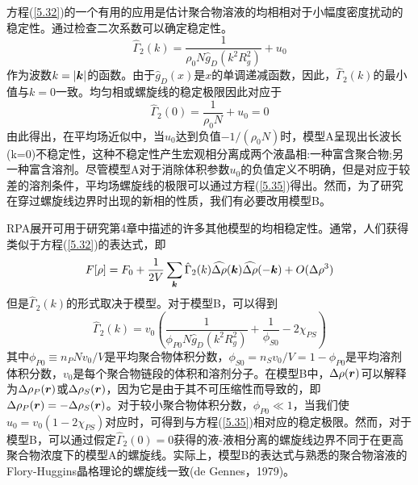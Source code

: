 方程(\ref{5.32})的一个有用的应用是估计聚合物溶液的均相相对于小幅度密度扰动的稳定性。通过检查二次系数可以确定稳定性。
\begin{equation}\label{5.34}
\hat{\Gamma}_2(k)=\frac{1}{\rho_0N\hat{g}_D(k^2R_g^2)}+u_0
\end{equation}
作为波数$k=\left|\bm{k}\right|$的函数。由于$\hat{g}_D(x)$是$x$的单调递减函数，因此，$\hat{\Gamma}_2(k)$的最小值与$k=0$一致。均匀相或螺旋线的稳定极限因此对应于
\begin{equation}\label{5.35}
\hat{\Gamma}_2(0)=\frac{1}{\rho_0N}+u_0=0
\end{equation}
由此得出，在平均场近似中，当$u_0$达到负值$-1/(\rho_0N)$时，模型A呈现出长波长(k=0)不稳定性，这种不稳定性产生宏观相分离成两个液晶相:一种富含聚合物;另一种富含溶剂。尽管模型A对于消除体积参数$u_0$的负值定义不明确，但是对应于较差的溶剂条件，平均场螺旋线的极限可以通过方程(\ref{5.35})得出。然而，为了研究在穿过螺旋线边界时出现的新相的性质，我们有必要改用模型B。

RPA展开可用于研究第4章中描述的许多其他模型的均相稳定性。通常，人们获得类似于方程(\ref{5.32})的表达式，即
\begin{equation}\label{5.36}
F[\rho]=F_0+\frac{1}{2V}\sum\limits_{\bm{k}}\hat{\Gamma}_2(k)\widehat{\Delta\rho}(\bm{k})\widehat{\Delta\rho}(-\bm{k})+O(\Delta\rho^3)
\end{equation}
但是$\hat{\Gamma}_2(k)$的形式取决于模型。对于模型B，可以得到
\begin{equation}\label{5.37}
\hat{\Gamma}_2(k)=v_0\left(\frac{1}{\phi_{P0}N\hat{g}_D(k^2R_g^2)}+\frac{1}{\phi_{S0}}-2\chi_{PS}\right)
\end{equation}
其中$\phi_{P0}\equiv n_PNv_0/V$是平均聚合物体积分数，$\phi_{S0}=n_Sv_0/V=1-\phi_{P0}$是平均溶剂体积分数，$v_0$是每个聚合物链段的体积和溶剂分子。在模型B中，$\Delta\rho(\bm{r})$可以解释为$\Delta\rho_P(\bm{r})$或$\Delta\rho_S(\bm{r})$，因为它是由于其不可压缩性而导致的，即$\Delta\rho_P(\bm{r})=-\Delta\rho_S(\bm{r})$。对于较小聚合物体积分数，$\phi_{P0}\ll 1$，当我们使$u_0=v_0(1-2\chi_{PS})$对应时，可得到与方程(\ref{5.35})相对应的稳定极限。然而，对于模型B，可以通过假定$\hat{\Gamma}_2(0)=0$获得的液-液相分离的螺旋线边界不同于在更高聚合物浓度下的模型A的螺旋线。实际上，模型B的表达式与熟悉的聚合物溶液的Flory-Huggins晶格理论的螺旋线一致(de Gennes，1979)。

